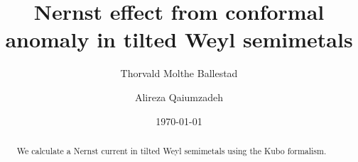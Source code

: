 \documentclass[%
 reprint,
 amsmath,amssymb,
 aps,
]{revtex4-2}
\begin{document}

\title{Nernst effect from conformal anomaly in tilted Weyl semimetals}%

\author{Thorvald Molthe Ballestad}

\author{Alireza Qaiumzadeh}%
%




\date{\today}%

\begin{abstract}
  We calculate a Nernst current in tilted Weyl semimetals using the Kubo formalism.

\end{abstract}

\maketitle
\end{document}

